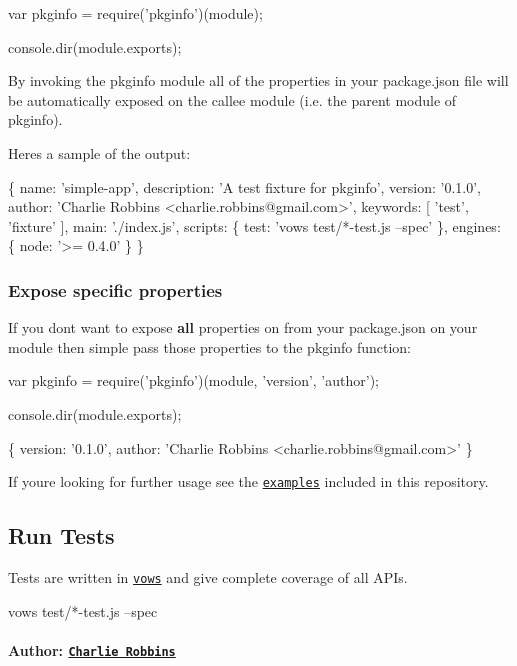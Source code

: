 \begin{DoxyCode}
var pkginfo = require('pkginfo')(module);

console.dir(module.exports);
\end{DoxyCode}


By invoking the {\ttfamily pkginfo} module all of the properties in your {\ttfamily package.\+json} file will be automatically exposed on the callee module (i.\+e. the parent module of {\ttfamily pkginfo}).

Here\textquotesingle{}s a sample of the output\+:


\begin{DoxyCode}
\{ name: 'simple-app',
  description: 'A test fixture for pkginfo',
  version: '0.1.0',
  author: 'Charlie Robbins <charlie.robbins@gmail.com>',
  keywords: [ 'test', 'fixture' ],
  main: './index.js',
  scripts: \{ test: 'vows test/*-test.js --spec' \},
  engines: \{ node: '>= 0.4.0' \} \}
\end{DoxyCode}


\subsubsection*{Expose specific properties}

If you don\textquotesingle{}t want to expose {\bfseries all} properties on from your {\ttfamily package.\+json} on your module then simple pass those properties to the {\ttfamily pkginfo} function\+:


\begin{DoxyCode}
var pkginfo = require('pkginfo')(module, 'version', 'author');

console.dir(module.exports);
\end{DoxyCode}



\begin{DoxyCode}
\{ version: '0.1.0',
  author: 'Charlie Robbins <charlie.robbins@gmail.com>' \}
\end{DoxyCode}


If you\textquotesingle{}re looking for further usage see the \href{https://github.com/indexzero/node-pkginfo/tree/master/examples}{\tt examples} included in this repository.

\subsection*{Run Tests}

Tests are written in \href{http://vowsjs.org}{\tt vows} and give complete coverage of all A\+P\+Is.


\begin{DoxyCode}
vows test/*-test.js --spec
\end{DoxyCode}


\paragraph*{Author\+: \href{http://nodejitsu.com}{\tt Charlie Robbins}}
